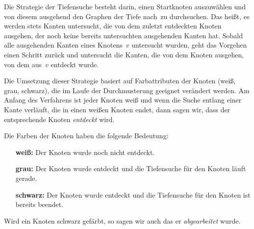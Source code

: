 \begin{bem} 
Die Strategie der Tiefensuche besteht darin, einen Startknoten auszuwählen und von diesem ausgehend den Graphen \glqq der Tiefe nach\grqq\ zu durchsuchen.
Das heißt, es werden stets Kanten untersucht, die von dem zuletzt entdeckten Knoten ausgehen, der noch keine bereits untersuchten ausgehenden Kanten hat.
Sobald alle ausgehenden Kanten eines Knotens~$v$ untersucht wurden, geht das Vorgehen einen Schritt zurück und untersucht die Kanten, die von dem Knoten ausgehen, von dem aus~$v$ entdeckt wurde.

Die Umsetzung dieser Strategie basiert auf Farbattributen der Knoten (weiß, grau, schwarz), die im Laufe der Durchmusterung geeignet verändert werden.
Am Anfang des Verfahrens ist jeder Knoten weiß und wenn die Suche entlang einer Kante verläuft, die in einen weißen Knoten endet, dann sagen wir, dass der entsprechende Knoten \emph{entdeckt} wird.

Die Farben der Knoten haben die folgende Bedeutung: 
\begin{itemize}
\setlength{\itemindent}{30pt}
	\item[{\bfseries weiß:}] Der Knoten wurde noch nicht entdeckt. 
	\item[{\bfseries grau:}] Der Knoten wurde entdeckt und die Tiefensuche für den Knoten läuft gerade.
	\item[{\bfseries schwarz:}] Der Knoten wurde entdeckt und die Tiefensuche für den Knoten ist bereits beendet.
\end{itemize}

Wird ein Knoten schwarz gefärbt, so sagen wir auch das er \emph{abgearbeitet} wurde.
\end{bem}

